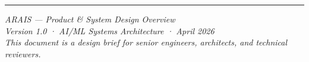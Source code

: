 \documentclass[11pt, a4paper]{article}
\begin{document}
\vspace{12pt}
\noindent\color{accent}\rule{\linewidth}{1.2pt}
\begin{center}
  \small\color{subtle}
  \textit{ARAIS — Product \& System Design Overview}\\
  \textit{Version 1.0 · AI/ML Systems Architecture · April 2026}\\
  \textit{This document is a design brief for senior engineers, architects, and technical reviewers.}
\end{center}
\end{document}
